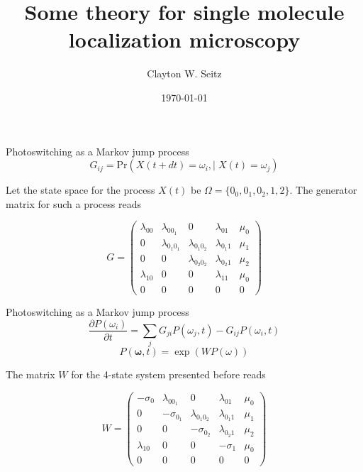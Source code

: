 \documentclass[aspectratio=169]{beamer}
\title{Some theory for single molecule localization microscopy}	%
\author{Clayton W. Seitz}								%
\date{\today}									%
\begin{document}
\begin{frame}
  \titlepage
\end{frame}

\begin{frame}{Photoswitching as a Markov jump process}
\begin{equation*}
G_{ij} = \mathrm{Pr}\left(X(t+dt)=\omega_{i}, | \;X(t)=\omega_{j}\right)
\end{equation*}

Let the state space for the process $X(t)$ be $\Omega = \{0_{0},0_{1},0_{2},1,2\}$. The generator matrix for such a process reads

\begin{equation*}
G = 
\begin{pmatrix}
\lambda_{00} & \lambda_{0 0_{1}} & 0 & \lambda_{01} & \mu_{0}\\
0 & \lambda_{0_{1}0_{1}} & \lambda_{0_{1}0_{2}} & \lambda_{0_{1}1} & \mu_{1}\\
0 & 0 & \lambda_{0_{2}0_{2}} & \lambda_{0_{2}1} & \mu_{2}\\
\lambda_{10} & 0 & 0 & \lambda_{11} & \mu_{0}\\
0 & 0 & 0 & 0 & 0
\end{pmatrix}
\end{equation*}
\end{frame}

\begin{frame}{Photoswitching as a Markov jump process}
\begin{equation*}
\frac{\partial P(\omega_{i})}{\partial t} = \sum_{j}G_{ji}P(\omega_{j},t) - G_{ij}P(\omega_{i},t)
\end{equation*}
\begin{equation*}
P(\bm{\omega}, t) = \exp(W P(\omega))
\end{equation*}

The matrix $W$ for the 4-state system presented before reads

\begin{equation*}
W = 
\begin{pmatrix}
-\sigma_{0} & \lambda_{0 0_{1}} & 0 & \lambda_{01} & \mu_{0}\\
0 & -\sigma_{0_{1}} & \lambda_{0_{1}0_{2}} & \lambda_{0_{1}1} & \mu_{1}\\
0 & 0 & -\sigma_{0_{2}} & \lambda_{0_{2}1} & \mu_{2}\\
\lambda_{10} & 0 & 0 & -\sigma_{1} & \mu_{0}\\
0 & 0 & 0 & 0 & 0
\end{pmatrix}
\end{equation*}

\end{frame}
\end{document}
